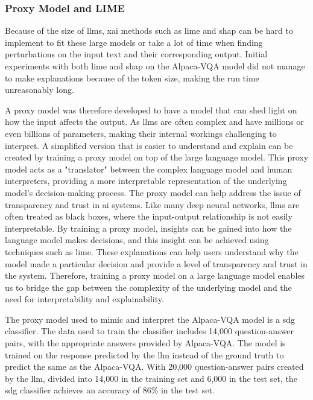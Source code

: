         \subsubsection{Proxy Model and LIME}
        Because of the size of \glspl{llm}, \gls{xai} methods such as \gls{lime} and \gls{shap} can be hard to implement to fit these large models or take a lot of time when finding perturbations on the input text and their corresponding output. Initial experiments with both \gls{lime} and \gls{shap} on the Alpaca-VQA model did not manage to make explanations because of the token size, making the run time unreasonably long.
        
        
        A proxy model was therefore developed to have a model that can shed light on how the input affects the output. 
        As \glspl{llm} are often complex and have millions or even billions of parameters, making their internal workings challenging to interpret. A simplified version that is easier to understand and explain can be created by training a proxy model on top of the large language model. This proxy model acts as a "translator" between the complex language model and human interpreters, providing a more interpretable representation of the underlying model's decision-making process.
        The proxy model can help address the issue of transparency and trust in \gls{ai} systems. Like many deep neural networks, \glspl{llm} are often treated as black boxes, where the input-output relationship is not easily interpretable. By training a proxy model, insights can be gained into how the language model makes decisions, and this insight can be achieved using techniques such as \gls{lime}. 
        These explanations can help users understand why the model made a particular decision and provide a level of transparency and trust in the system.
        Therefore, training a proxy model on a large language model enables us to bridge the gap between the complexity of the underlying model and the need for interpretability and explainability.

        The proxy model used to mimic and interpret the Alpaca-VQA model is a \gls{sdg} classifier. 
        The data used to train the classifier includes 14,000 question-answer pairs, with the appropriate answers provided by Alpaca-VQA. The model is trained on the response predicted by the \gls{llm} instead of the ground truth to predict the same as the Alpaca-VQA. With 20,000 question-answer pairs created by the \gls{llm}, divided into 14,000 in the training set and 6,000 in the test set, the \gls{sdg} classifier achieves an accuracy of 86\% in the test set.
        
